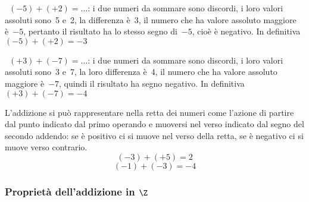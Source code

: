 \begin{esempio}{}{}
~\((-5)+(+2)=\ldots\): i due numeri da sommare sono discordi, i loro valori 
assoluti sono~5 e~2, la differenza è~3,
il numero che ha valore assoluto maggiore è~\(-5\), pertanto il risultato 
ha lo stesso segno di~\(-5\), cioè è negativo.
In definitiva~\((-5)+(+2)=-3\)
\end{esempio}


\begin{esempio}{}{}
~\((+3)+(-7)=\ldots\): i due numeri da sommare sono discordi, i loro valori 
assoluti sono~3 e~7, la loro differenza è~4,
il numero che ha valore assoluto maggiore è~\(-7\), quindi il risultato ha 
segno negativo.
In definitiva~\((+3)+(-7)=-4\)
\end{esempio}

L'addizione si può rappresentare nella retta dei numeri come l'azione di 
partire dal punto indicato dal primo operando e 
muoversi nel verso indicato dal segno del secondo addendo: 
se è positivo ci si muove nel verso della retta, 
se è negativo ci si muove verso contrario.
\[(-3)+(+5)=2\]
% 
  {\intaddlinea}
% 
\[ (-1)+(-3) = -4\]
% 
{\intaddlineb}

\subsubsection{Proprietà dell'addizione in \texorpdfstring{$\Z$}{Z}}

